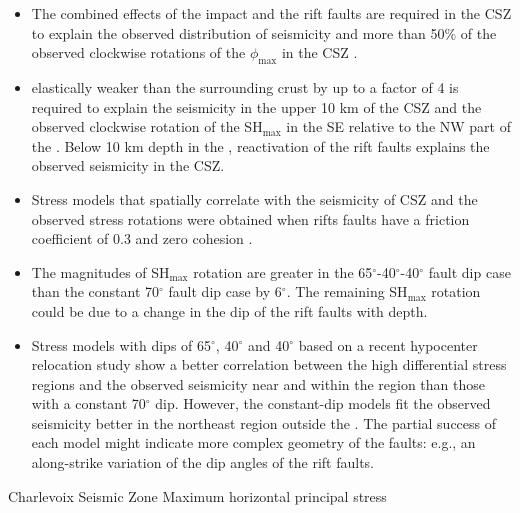 \documentclass[draft]{agujournal2018}
\begin{document}
\begin{itemize}

\item The combined effects of the impact  and the rift faults are required in the CSZ to explain the observed distribution of seismicity and more than 50$\%$ of the observed clockwise rotations of the $\phi_{\max}$ in the CSZ .

\item {} elastically weaker than the surrounding crust by up to a factor of 4 is required to explain the seismicity in the upper 10 km of the CSZ and the observed clockwise rotation of the SH$_{\max}$ in the SE relative to the NW part of the . Below 10 km depth in the , reactivation of the rift faults explains the observed seismicity in the CSZ.

\item Stress models that spatially correlate with the seismicity of CSZ and the observed stress rotations were obtained when rifts faults have a friction coefficient of 0.3 and zero cohesion .

\item The magnitudes of SH$_{\max}$ rotation are greater in the 65$^\circ$-40$^\circ$-40$^\circ$ fault dip case than the constant 70$^\circ$ fault dip case by 6$^\circ$. The remaining SH$_{\max}$ rotation could be due to a change in the dip of the rift faults with depth.

\item Stress models with dips of 65$^\circ$, 40$^\circ$ and 40$^\circ$ based on a recent hypocenter relocation study show a better correlation between the high differential stress regions and the observed seismicity near and within the  region than those with a constant 70$^\circ$ dip. However, the constant-dip models fit the observed seismicity better in the northeast region outside the . The partial success of each model might indicate more complex geometry of the faults: e.g., an along-strike variation of the dip angles of the rift faults.
 
\end{itemize}


\begin{acronyms}
  Charlevoix Seismic Zone
  Maximum horizontal principal stress 
\end{acronyms}
\end{document}
